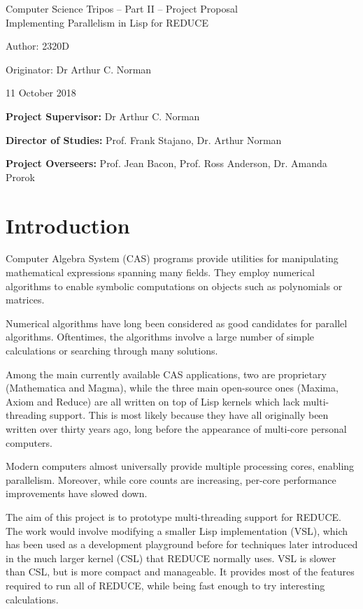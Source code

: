\documentclass[12pt,a4paper,twoside]{article}
\begin{document}
\begin{center}
\Large
Computer Science Tripos -- Part II -- Project Proposal\\[4mm]
\LARGE
Implementing Parallelism in Lisp for REDUCE

\large
Author: 2320D

Originator: Dr Arthur C. Norman

11 October 2018
\end{center}

\vspace{5mm}

\textbf{Project Supervisor:} Dr Arthur C. Norman

\textbf{Director of Studies:} Prof. Frank Stajano, Dr. Arthur Norman 

\textbf{Project Overseers:} Prof. Jean Bacon, Prof. Ross Anderson, Dr. Amanda Prorok


\section*{Introduction}

Computer Algebra System (CAS) programs provide utilities for manipulating mathematical expressions
spanning many fields. They employ  numerical algorithms to enable symbolic computations
on objects such as polynomials or matrices.

Numerical algorithms have long been considered as good candidates for parallel algorithms.
Oftentimes, the algorithms involve a large number of simple calculations or searching through
many solutions.

Among the main currently available CAS applications, two are proprietary (Mathematica and Magma),
while the three main open-source ones (Maxima, Axiom and Reduce) are all written on top of Lisp
kernels which lack multi-threading support. This is most likely because they have all originally been
written over thirty years ago, long before the appearance of multi-core personal computers.

Modern computers almost universally provide multiple processing cores, enabling parallelism.
Moreover, while core counts are increasing, per-core performance improvements have slowed down.

The aim of this project is to prototype multi-threading support for REDUCE. The work would involve
modifying a smaller Lisp implementation (VSL), which has been used as a development playground
before for techniques later introduced in the much larger kernel (CSL) that REDUCE normally uses.
VSL is slower than CSL, but is more compact and manageable. It provides
most of the features required to run all of REDUCE, while being fast enough to try
interesting calculations.
\end{document}
